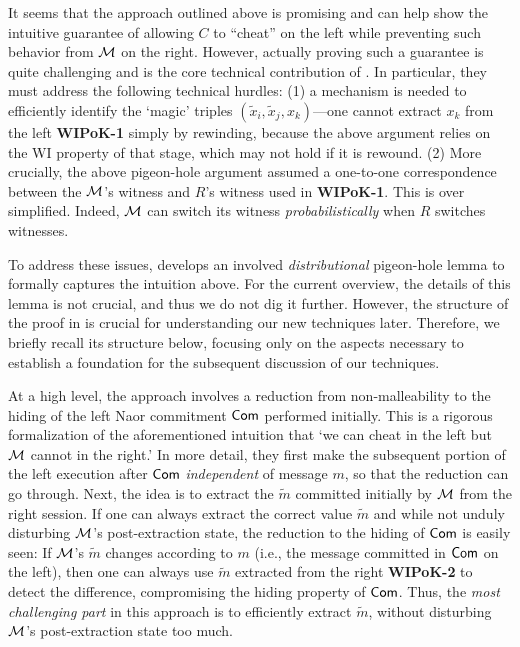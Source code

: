 It seems that the approach outlined above is promising and can help show the intuitive guarantee of allowing $C$ to ``cheat'' on the left while preventing such behavior from $\mathcal{M}$ on the right. However, actually proving such a guarantee is quite challenging and is the core technical contribution of \cite{FOCS:LPY23}. In particular, they must address the following technical hurdles: (1) a mechanism is needed to efficiently identify the `magic' triples $(\tilde{x}_i,\tilde{x}_j,x_k)$---one cannot extract $x_k$ from the left {\bf WIPoK-1} simply by rewinding, because the above argument relies on the WI property of that stage, which may not hold if it is rewound. (2) More crucially, the above pigeon-hole argument assumed a one-to-one correspondence between the $\mathcal{M}$'s witness and $R$'s witness used in {\bf WIPoK-1}. This is over simplified. Indeed, $\mathcal{M}$ can switch its witness {\em probabilistically} when $R$ switches witnesses. 

To address these issues, \cite{FOCS:LPY23} develops an involved {\em distributional} pigeon-hole lemma to formally captures the intuition above. For the current overview, the details of this lemma is not crucial, and thus we do not dig it further. However, the structure of the proof in \cite{FOCS:LPY23} is crucial for understanding our new techniques later. Therefore, we briefly recall its structure below, focusing only on the aspects necessary to establish a foundation for the subsequent discussion of our techniques.

 At a high level, the \cite{FOCS:LPY23} approach involves a reduction from non-malleability to the hiding of the left Naor commitment $\mathsf{Com}$ performed initially. This is a rigorous formalization of the aforementioned intuition that `we can cheat in the left but $\mathcal{M}$ cannot in the right.' In more detail, they first make the subsequent portion of the left execution after $\mathsf{Com}$ {\em independent} of message $m$, so that the reduction can go through. Next, the idea is to extract the $\tilde{m}$ committed initially by $\mathcal{M}$ from the right session. If one can always extract the correct value $\tilde{m}$ and while not unduly disturbing $\mathcal{M}$'s post-extraction state, the reduction to the hiding of $\mathsf{Com}$ is easily seen: If $\mathcal{M}$'s $\tilde{m}$ changes according to $m$ (i.e., the message committed in $\mathsf{Com}$ on the left), then one can always use $\tilde{m}$ extracted from the right {\bf WIPoK-2} to detect the difference, compromising the hiding property of $\mathsf{Com}$. Thus, the {\em most challenging part} in this approach is to efficiently extract $\tilde{m}$, without disturbing $\mathcal{M}$'s post-extraction state too much.


